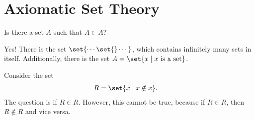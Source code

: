 \documentclass[10pt]{mypackage}
\begin{document}
\section{Axiomatic Set Theory}%
\begin{question}
  Is there a set $A$ such that $A\in A$?
\begin{answer}
  Yes! There is the set $\set{\cdots\set{}\cdots}$, which contains infinitely many sets in itself. Additionally, there is the set $A = \set{x\mid x\text{ is a set}}$.
\end{answer}
\end{question}
\begin{example}
Consider the set
\begin{align*}
  R &= \set{x\mid x\notin x}.
\end{align*}
The question is if $R\in R$. However, this cannot be true, because if $R\in R$, then $R\notin R$ and vice versa.
\end{example}
\end{document}
